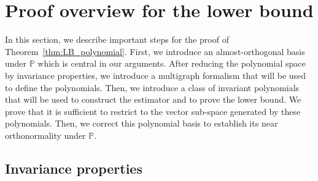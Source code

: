 \documentclass{article}
\newcommand{\alex}[1]{\textcolor{magenta}{[alex: #1]}}
\begin{document}













\section{Proof overview for the lower bound}\label{sec:family:polynomial}


In this section, we describe important steps for the proof of Theorem~\ref{thm:LB_polynomial}. First, we introduce an almost-orthogonal basis under $\mathbb{P}$ which is central in our arguments. After reducing the polynomial space by invariance properties, we introduce a multigraph formalism that will be used to define the polynomials. Then, we introduce a class of invariant polynomials that will be used to construct the estimator and to prove the lower bound. We prove that it is sufficient to restrict to the vector sub-space generated by these polynomials. Then, we correct this polynomial basis to establish its near orthonormality under $\mathbb{P}$.


\subsection{Invariance properties}
\end{document}

